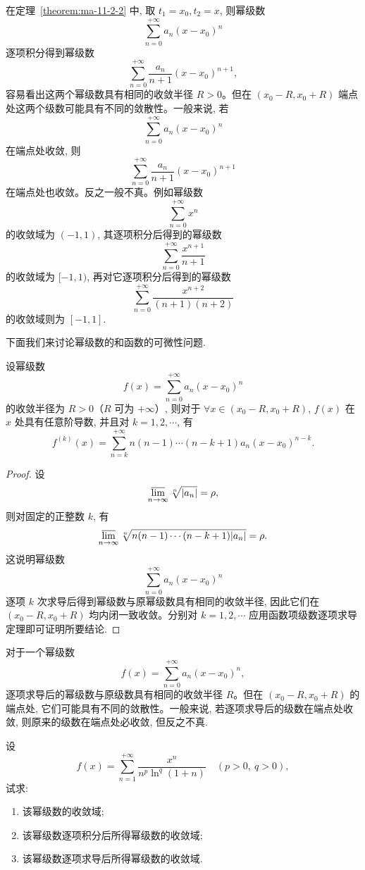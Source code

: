 \begin{remark}\label{remark:ma-11-source-28}
在定理~\ref{theorem:ma-11-2-2} 中, 取 $t_1=x_0,t_2=x$, 则幂级数
\[
  \sum_{n=0}^{+\infty}a_n(x-x_0)^n
\]
逐项积分得到幂级数
\[
  \sum_{n=0}^{+\infty}\frac{a_n}{n+1}(x-x_0)^{n+1},
\]
容易看出这两个幂级数具有相同的收敛半径 $R>0$。但在 $(x_0-R,x_0+R)$ 端点处这两个级数可能具有不同的敛散性。一般来说, 若
\[
  \sum_{n=0}^{+\infty}a_n(x-x_0)^n
\]
在端点处收敛, 则
\[
  \sum_{n=0}^{+\infty}\frac{a_n}{n+1}(x-x_0)^{n+1}
\]
在端点处也收敛。反之一般不真。例如幂级数
\[
  \sum_{n=0}^{+\infty}x^n
\]
的收敛域为 $(-1,1)$, 其逐项积分后得到的幂级数
\[
  \sum_{n=0}^{+\infty}\frac{x^{n+1}}{n+1}
\]
的收敛域为 $[-1,1)$, 再对它逐项积分后得到的幂级数
\[
  \sum_{n=0}^{+\infty}\frac{x^{n+2}}{(n+1)(n+2)}
\]
的收敛域则为 $[-1,1]$.
\end{remark}

下面我们来讨论幂级数的和函数的可微性问题.

\begin{theorem}\label{theorem:ma-11-2-3}
设幂级数
\[
  f(x)=\sum_{n=0}^{+\infty}a_n(x-x_0)^n
\]
的收敛半径为 $R>0$（$R$ 可为 $+\infty$）, 则对于 $\forall x\in(x_0-R,x_0+R)$, $f(x)$ 在 $x$ 处具有任意阶导数, 并且对 $k=1,2,\cdots$, 有
\[
  f^{(k)}(x)
  =
  \sum_{n=k}^{+\infty}n(n-1)\cdots(n-k+1)a_n(x-x_0)^{n-k}.
\]
\end{theorem}


\begin{proof}
设
\[
  \varlimsup_{n\to\infty}\sqrt[n]{|a_n|}=\rho,
\]
则对固定的正整数 $k$, 有
\[
  \varlimsup_{n\to\infty}
  \sqrt[n]{n(n-1)\cdots(n-k+1)|a_n|}
  =\rho.
\]
这说明幂级数
\[
  \sum_{n=0}^{+\infty}a_n(x-x_0)^n
\]
逐项 $k$ 次求导后得到幂级数与原幂级数具有相同的收敛半径, 因此它们在 $(x_0-R,x_0+R)$ 均内闭一致收敛。分别对 $k=1,2,\cdots$ 应用函数项级数逐项求导定理即可证明所要结论.
\end{proof}


对于一个幂级数
\[
  f(x)=\sum_{n=0}^{+\infty}a_n(x-x_0)^n,
\]
逐项求导后的幂级数与原级数具有相同的收敛半径 $R$。但在 $(x_0-R,x_0+R)$ 的端点处, 它们可能具有不同的敛散性。一般来说, 若逐项求导后的级数在端点处收敛, 则原来的级数在端点处必收敛, 但反之不真.

\begin{example}\label{example:ma-11-2-1}
设
\[
  f(x)=\sum_{n=1}^{+\infty}\frac{x^n}{n^p\ln^q(1+n)}
  \quad(p>0,\ q>0),
\]
试求:
\begin{enumerate}
  \item 该幂级数的收敛域;
  \item 该幂级数逐项积分后所得幂级数的收敛域;
  \item 该幂级数逐项求导后所得幂级数的收敛域.
\end{enumerate}
\end{example}


